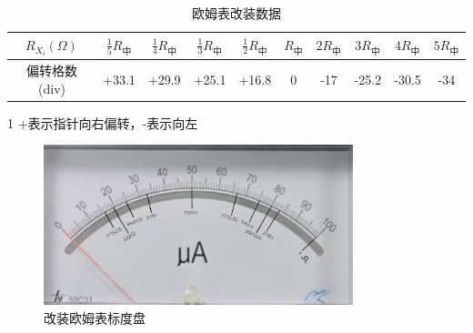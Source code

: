 \documentclass{article}
\begin{document}
\begin{table}[h]
    \centering
    \renewcommand{\arraystretch}{1.5}
    \caption{欧姆表改装数据}
    \label{table1}
    \vspace{8pt}
    \begin{threeparttable}
    \begin{tabular}{cccccccccc} 
        \hline
        $R_{X_i}(\Omega)$ & $\frac{1}{5}R_中$ & $\frac{1}{4}R_中$ & $\frac{1}{3}R_中$ & $\frac{1}{2}R_中$ & $R_中$ & $2R_中$ & $3R_中$ & $4R_中$ & $5R_中$  \\ 
        \hline
        偏转格数(div) & +33.1 & +29.9 & +25.1 &+16.8 & 0 &-17&-25.2&-30.5&-34\\ \hline
        \hline
        \end{tabular}    
    \begin{tablenotes}
        \footnotesize               %
        \item[1]  +表示指针向右偏转，-表示向左         %
    \end{tablenotes}
    \end{threeparttable}
\end{table}

\begin{figure}[h]
    \centering
    \includegraphics[width=9cm]{3.3.jpg}
    \caption{改装欧姆表标度盘}
\end{figure}
\end{document}
